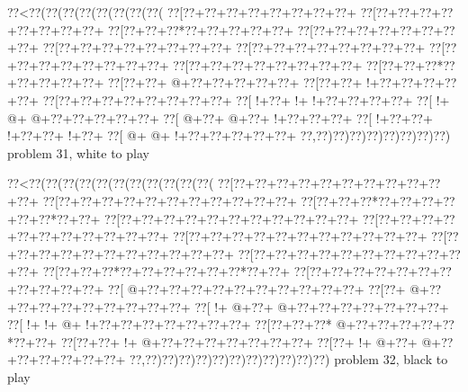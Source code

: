 \vbox{\vbox{\goo
\0??<\0??(\0??(\0??(\0??(\0??(\0??(\0??(\0??(
\0??[\0??+\0??+\0??+\0??+\0??+\0??+\0??+\0??+
\0??[\0??+\0??+\0??+\0??+\0??+\0??+\0??+\0??+
\0??[\0??+\0??+\0??*\0??+\0??+\0??+\0??+\0??+
\0??[\0??+\0??+\0??+\0??+\0??+\0??+\0??+\0??+
\0??[\0??+\0??+\0??+\0??+\0??+\0??+\0??+\0??+
\0??[\0??+\0??+\0??+\0??+\0??+\0??+\0??+\0??+
\0??[\0??+\0??+\0??+\0??+\0??+\0??+\0??+\0??+
\0??[\0??+\0??+\0??+\0??+\0??+\0??+\0??+\0??+
\0??[\0??+\0??+\0??*\0??+\0??+\0??+\0??+\0??+
\0??[\0??+\0??+\- @+\0??+\0??+\0??+\0??+\0??+
\0??[\0??+\0??+\- !+\0??+\0??+\0??+\0??+\0??+
\0??[\0??+\0??+\0??+\0??+\0??+\0??+\0??+\0??+
\0??[\- !+\0??+\- !+\- !+\0??+\0??+\0??+\0??+
\0??[\- !+\- @+\- @+\0??+\0??+\0??+\0??+\0??+
\0??[\- @+\0??+\- @+\0??+\- !+\0??+\0??+\0??+
\0??[\- !+\0??+\0??+\- !+\0??+\0??+\- !+\0??+
\0??[\- @+\- @+\- !+\0??+\0??+\0??+\0??+\0??+
\0??,\0??)\0??)\0??)\0??)\0??)\0??)\0??)\0??)
}
\hfil problem 31, white to play\hfil\break
}

\vbox{\vbox{\goo
\0??<\0??(\0??(\0??(\0??(\0??(\0??(\0??(\0??(\0??(\0??(\0??(
\0??[\0??+\0??+\0??+\0??+\0??+\0??+\0??+\0??+\0??+\0??+\0??+
\0??[\0??+\0??+\0??+\0??+\0??+\0??+\0??+\0??+\0??+\0??+\0??+
\0??[\0??+\0??+\0??*\0??+\0??+\0??+\0??+\0??+\0??*\0??+\0??+
\0??[\0??+\0??+\0??+\0??+\0??+\0??+\0??+\0??+\0??+\0??+\0??+
\0??[\0??+\0??+\0??+\0??+\0??+\0??+\0??+\0??+\0??+\0??+\0??+
\0??[\0??+\0??+\0??+\0??+\0??+\0??+\0??+\0??+\0??+\0??+\0??+
\0??[\0??+\0??+\0??+\0??+\0??+\0??+\0??+\0??+\0??+\0??+\0??+
\0??[\0??+\0??+\0??+\0??+\0??+\0??+\0??+\0??+\0??+\0??+\0??+
\0??[\0??+\0??+\0??*\0??+\0??+\0??+\0??+\0??+\0??*\0??+\0??+
\0??[\0??+\0??+\0??+\0??+\0??+\0??+\0??+\0??+\0??+\0??+\0??+
\0??[\- @+\0??+\0??+\0??+\0??+\0??+\0??+\0??+\0??+\0??+\0??+
\0??[\0??+\- @+\0??+\0??+\0??+\0??+\0??+\0??+\0??+\0??+\0??+
\0??[\- !+\- @+\0??+\- @+\0??+\0??+\0??+\0??+\0??+\0??+\0??+
\0??[\- !+\- !+\- @+\- !+\0??+\0??+\0??+\0??+\0??+\0??+\0??+
\0??[\0??+\0??+\0??*\- @+\0??+\0??+\0??+\0??+\0??*\0??+\0??+
\0??[\0??+\0??+\- !+\- @+\0??+\0??+\0??+\0??+\0??+\0??+\0??+
\0??[\0??+\- !+\- @+\0??+\- @+\0??+\0??+\0??+\0??+\0??+\0??+
\0??,\0??)\0??)\0??)\0??)\0??)\0??)\0??)\0??)\0??)\0??)\0??)
}
\hfil problem 32, black to play\hfil\break
}

